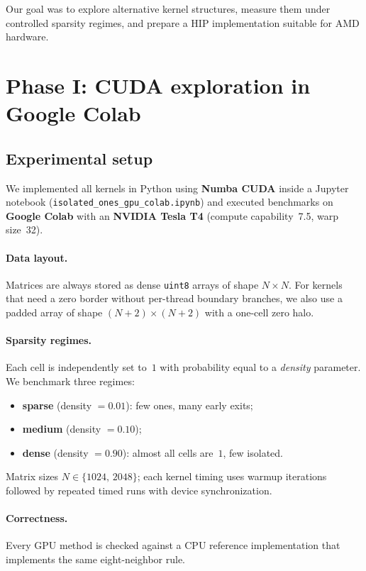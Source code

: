 \documentclass[11pt,a4paper]{article}
\begin{document}
Our goal was to explore alternative kernel structures, measure them under
controlled sparsity regimes, and prepare a HIP implementation suitable for AMD
hardware.

\section{Phase I: CUDA exploration in Google Colab}
\label{sec:phase1}

\subsection{Experimental setup}

We implemented all kernels in Python using \textbf{Numba CUDA} inside a Jupyter
notebook (\texttt{isolated\_ones\_gpu\_colab.ipynb}) and executed benchmarks on
\textbf{Google Colab} with an \textbf{NVIDIA Tesla T4} (compute capability~7.5,
warp size~32).

\paragraph{Data layout.}
Matrices are always stored as dense \texttt{uint8} arrays of shape $N\times N$.
For kernels that need a zero border without per-thread boundary branches, we
also use a padded array of shape $(N{+}2)\times(N{+}2)$ with a one-cell zero halo.

\paragraph{Sparsity regimes.}
Each cell is independently set to~$1$ with probability equal to a \emph{density}
parameter. We benchmark three regimes:
\begin{itemize}
  \item \textbf{sparse} (density $=0.01$): few ones, many early exits;
  \item \textbf{medium} (density $=0.10$);
  \item \textbf{dense} (density $=0.90$): almost all cells are~$1$, few isolated.
\end{itemize}
Matrix sizes $N \in \{1024,\,2048\}$; each kernel timing uses warmup iterations
followed by repeated timed runs with device synchronization.

\paragraph{Correctness.}
Every GPU method is checked against a CPU reference implementation that
implements the same eight-neighbor rule.
\end{document}
